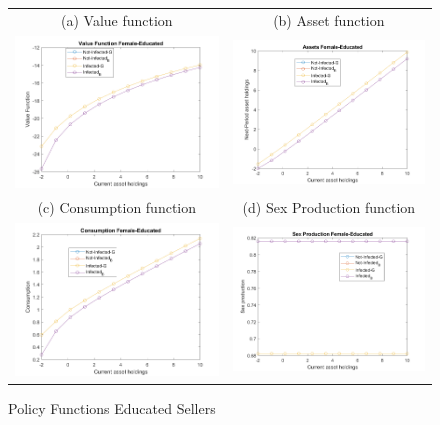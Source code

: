 \begin{figure}[H]
\caption{Policy Functions Educated Sellers}
\hspace{-2.0cm}
\begin{center}
\begin{tabular}{cc}
\multicolumn{1}{c}{(a) Value function} &  
\multicolumn{1}{c}{(b) Asset function} \\
\includegraphics[angle=0,width=.5\textwidth]{figures/FIG5.png}   & 
\includegraphics[angle=0,width=.5\textwidth]{figures/FIG7.png} \\
\multicolumn{1}{c}{(c) Consumption function} &  
\multicolumn{1}{c}{(d) Sex Production function } \\
\includegraphics[angle=0,width=.5\textwidth]{figures/FIG6.png}   & 
\includegraphics[angle=0,width=.5\textwidth]{figures/FIG8.png} \\
\end{tabular}
\end{center}
\label{fig:3}
\end{figure}



